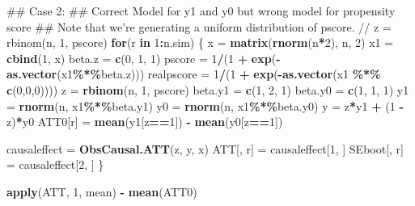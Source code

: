 \documentclass[]{article}
\newenvironment{Shaded}{\begin{snugshade}}{\end{snugshade}}
\newcommand{\KeywordTok}[1]{\textcolor[rgb]{0.13,0.29,0.53}{\textbf{#1}}}
\newcommand{\DecValTok}[1]{\textcolor[rgb]{0.00,0.00,0.81}{#1}}
\newcommand{\StringTok}[1]{\textcolor[rgb]{0.31,0.60,0.02}{#1}}
\newcommand{\ControlFlowTok}[1]{\textcolor[rgb]{0.13,0.29,0.53}{\textbf{#1}}}
\newcommand{\OperatorTok}[1]{\textcolor[rgb]{0.81,0.36,0.00}{\textbf{#1}}}
\newcommand{\NormalTok}[1]{#1}
\begin{document}
\begin{Shaded}
\begin{Highlighting}[]
\NormalTok{## Case 2:}
\NormalTok{## Correct Model for y1 and y0 but wrong model for propensity score}
\NormalTok{## Note that we're generating a uniform distribution of pscore. // z = rbinom(n, 1, pscore)}
\ControlFlowTok{for}\NormalTok{(r }\ControlFlowTok{in} \DecValTok{1}\OperatorTok{:}\NormalTok{n.sim)}
\NormalTok{\{}
\NormalTok{  x       =}\StringTok{ }\KeywordTok{matrix}\NormalTok{(}\KeywordTok{rnorm}\NormalTok{(n}\OperatorTok{*}\DecValTok{2}\NormalTok{), n, }\DecValTok{2}\NormalTok{)}
\NormalTok{  x1      =}\StringTok{ }\KeywordTok{cbind}\NormalTok{(}\DecValTok{1}\NormalTok{, x)}
\NormalTok{  beta.z  =}\StringTok{ }\KeywordTok{c}\NormalTok{(}\DecValTok{0}\NormalTok{, }\DecValTok{1}\NormalTok{, }\DecValTok{1}\NormalTok{)}
\NormalTok{  pscore  =}\StringTok{ }\DecValTok{1}\OperatorTok{/}\NormalTok{(}\DecValTok{1} \OperatorTok{+}\StringTok{ }\KeywordTok{exp}\NormalTok{(}\OperatorTok{-}\StringTok{ }\KeywordTok{as.vector}\NormalTok{(x1}\OperatorTok{\%*\%}\NormalTok{beta.z)))}
\NormalTok{  realpscore =}\StringTok{ }\DecValTok{1}\OperatorTok{/}\NormalTok{(}\DecValTok{1} \OperatorTok{+}\StringTok{ }\KeywordTok{exp}\NormalTok{(}\OperatorTok{-}\KeywordTok{as.vector}\NormalTok{(x1 }\OperatorTok{\%*\%}\StringTok{ }\KeywordTok{c}\NormalTok{(}\DecValTok{0}\NormalTok{,}\DecValTok{0}\NormalTok{,}\DecValTok{0}\NormalTok{))))}
\NormalTok{  z       =}\StringTok{ }\KeywordTok{rbinom}\NormalTok{(n, }\DecValTok{1}\NormalTok{, pscore)}
\NormalTok{  beta.y1 =}\StringTok{ }\KeywordTok{c}\NormalTok{(}\DecValTok{1}\NormalTok{, }\DecValTok{2}\NormalTok{, }\DecValTok{1}\NormalTok{)}
\NormalTok{  beta.y0 =}\StringTok{ }\KeywordTok{c}\NormalTok{(}\DecValTok{1}\NormalTok{, }\DecValTok{1}\NormalTok{, }\DecValTok{1}\NormalTok{)}
\NormalTok{  y1      =}\StringTok{ }\KeywordTok{rnorm}\NormalTok{(n, x1}\OperatorTok{\%*\%}\NormalTok{beta.y1)}
\NormalTok{  y0      =}\StringTok{ }\KeywordTok{rnorm}\NormalTok{(n, x1}\OperatorTok{\%*\%}\NormalTok{beta.y0)}
\NormalTok{  y       =}\StringTok{ }\NormalTok{z}\OperatorTok{*}\NormalTok{y1 }\OperatorTok{+}\StringTok{ }\NormalTok{(}\DecValTok{1} \OperatorTok{-}\StringTok{ }\NormalTok{z)}\OperatorTok{*}\NormalTok{y0}
\NormalTok{  ATT0[r] =}\StringTok{ }\KeywordTok{mean}\NormalTok{(y1[z}\OperatorTok{==}\DecValTok{1}\NormalTok{]) }\OperatorTok{-}\StringTok{ }\KeywordTok{mean}\NormalTok{(y0[z}\OperatorTok{==}\DecValTok{1}\NormalTok{])}
  
\NormalTok{  causaleffect =}\StringTok{ }\KeywordTok{ObsCausal.ATT}\NormalTok{(z, y, x)}
\NormalTok{  ATT[, r]     =}\StringTok{ }\NormalTok{causaleffect[}\DecValTok{1}\NormalTok{, ]}
\NormalTok{  SEboot[, r]  =}\StringTok{ }\NormalTok{causaleffect[}\DecValTok{2}\NormalTok{, ]}
\NormalTok{\}}

\KeywordTok{apply}\NormalTok{(ATT, }\DecValTok{1}\NormalTok{, mean) }\OperatorTok{-}\StringTok{ }\KeywordTok{mean}\NormalTok{(ATT0)}
\end{Highlighting}
\end{Shaded}
\end{document}
